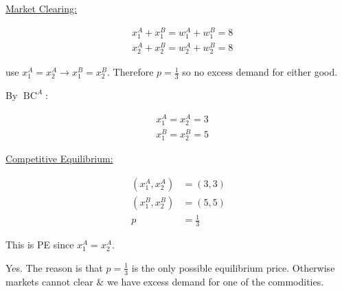 {\begin{enumerate}[label=(\alph*)]
{\underline{Market Clearing:}

\begin{align*}
    & x_1^A+x_1^B = w_1^A+w_1^B=8 \\
    & x_2^A+x_2^B = w_2^A+w_2^B=8
\end{align*}

use $x_1^A=x_2^A \longrightarrow x_1^B=x_2^B$. Therefore $p=\frac{1}{3}$ so no excess demand for either good.

By $\operatorname{BC}^A$:

\begin{align*}
    & x_1^A=x_2^A=3 \\
    & x_1^B=x_2^B=5
\end{align*}

\underline{Competitive Equilibrium:}

\begin{align*}
    \left(x_1^A, x_2^A\right) & =(3,3) \\
    \left(x_1^B, x_2^B\right) & =(5,5) \\
    p & =\frac{1}{3}
\end{align*}

This is PE since $x_1^A = x_2^A$.
}
{\item 
Yes. The reason is that $p=\frac{1}{3}$ is the only possible equilibrium price. Otherwise markets cannot clear \& we have excess demand for one of the commodities.
}
\end{enumerate}
}

